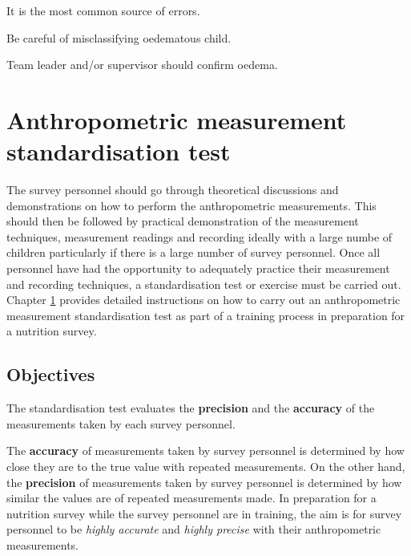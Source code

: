 \documentclass[12pt,]{book}
\theoremstyle{definition}
\theoremstyle{definition}
\theoremstyle{definition}
\theoremstyle{remark}
\begin{document}
\item 

It is the most common source of errors.

\item 

Be careful of misclassifying oedematous child.

\item 

Team leader and/or supervisor should confirm oedema.

\hypertarget{standard}{%
\chapter{Anthropometric measurement standardisation
test}\label{standard}}

The survey personnel should go through theoretical discussions and
demonstrations on how to perform the anthropometric measurements. This
should then be followed by practical demonstration of the measurement
techniques, measurement readings and recording ideally with a large
numbe of children particularly if there is a large number of survey
personnel. Once all personnel have had the opportunity to adequately
practice their measurement and recording techniques, a standardisation
test or exercise must be carried out. Chapter \ref{standard} provides
detailed instructions on how to carry out an anthropometric measurement
standardisation test as part of a training process in preparation for a
nutrition survey.

\hypertarget{objectives}{%
\section{Objectives}\label{objectives}}

The standardisation test evaluates the \textbf{precision} and the
\textbf{accuracy} of the measurements taken by each survey personnel.

The \textbf{accuracy} of measurements taken by survey personnel is
determined by how close they are to the true value with repeated
measurements. On the other hand, the \textbf{precision} of measurements
taken by survey personnel is determined by how similar the values are of
repeated measurements made. In preparation for a nutrition survey while
the survey personnel are in training, the aim is for survey personnel to
be \emph{highly accurate} and \emph{highly precise} with their
anthropometric measurements.
\end{document}
